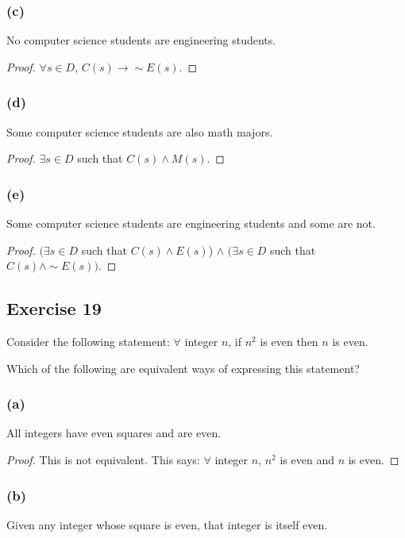 \documentclass[14pt]{extarticle}
\newcommand{\fa}{\forall}
\newcommand{\te}{\exists}
\begin{document}
\subsubsection{(c)}
No computer science students are engineering students.

\begin{proof}
    $\fa s \in D$, $C(s) \to \sim E(s)$.
\end{proof}

\subsubsection{(d)}
Some computer science students are also math majors.

\begin{proof}
    $\te s \in D$ such that $C(s) \wedge M(s)$.
\end{proof}

\subsubsection{(e)}
Some computer science students are engineering students and some are not.

\begin{proof}
    $(\te s \in D$ such that $C(s) \wedge E(s)$) $\wedge$ $(\te s \in D$ such that $C(s) \wedge \sim E(s))$.
\end{proof}

\subsection{Exercise 19}
Consider the following statement: $\fa$ integer $n$, if $n^2$ is even then $n$ is even.

Which of the following are equivalent ways of expressing this statement?

\subsubsection{(a)}
All integers have even squares and are even.

\begin{proof}
    This is not equivalent. This says: $\fa$ integer $n$, $n^2$ is even and $n$ is even.
\end{proof}

\subsubsection{(b)}
Given any integer whose square is even, that integer is itself even.
\end{document}
